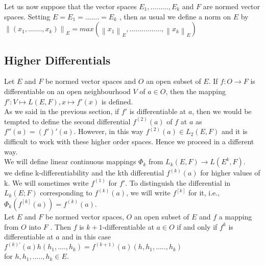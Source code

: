 \documentclass[11 pt]{article}
\theoremstyle{definition}
\theoremstyle{remark}
\newcommand\norm[1]{\left\lVert#1\right\rVert}
\begin{document}
Let us now suppose that the vector spaces $E_1,.........,E_k$ and $F$ are normed vector
spaces. Setting $E =E_1 =.......= E_k$ , then as usual we define a norm on $E$ by\\
\hspace*{3cm} $ \norm{(x_1,.......,x_k)}_E = max (\norm{x_1}_E ,................, \norm{x_k}_E)$



\subsection{Higher Differentials}
Let $E$ and $F$ be normed vector spaces and $O$ an open subset of $E$. If $f: O \to F$ is differentiable on an open neighbourhood $V$ of $a \in O$, then the mapping\\
\hspace*{3cm} $f': V \mapsto L(E,F), x \mapsto f'(x)$ is defined.\\


As we said in the previous section, if $f'$ is differentiable at $a$, then we would be tempted to define the second differential $f^{(2)}(a)$ of $f$ at $a$ as $f''(a) = (f')'(a)$. However, in this way $f^{(2)}(a) \in L_2(E,F)$ and it is difficult to work with these higher order spaces. Hence we proceed in a different way.\\

We will define linear continuous mappings $\Phi_k$ from $L_k (E, F) \to L(E^k, F)$. \\

we define k-differentiability and the kth differential $f^{(k)}(a)$ for higher values of k. We will sometimes write $f^{(1)}$ for $f'$. To distinguish the differential in $L_k(E; F)$  corresponding to $f^{(k)}(a)$, we will write $f^{[k]}$ for it, i.e., $\Phi_k (f^{[k]}(a)) = f^{(k)}(a)$.\\
 
\proposition Let $E$ and $F$ be normed vector spaces, $O$ an open subset of $E$ and $f$ a mapping from $O$ into $F$ . Then $f$ is $k + 1$-differentiable at $a \in O$ if and only if $f^k$ is differentiable at $a$ and in this case\\
\hspace*{3cm} $f^{(k)'}(a)h(h_1,....,h_k) = f^{(k+1)}(a)(h,h_1,.....,h_k)$\\

for $h,h_1,.....,h_k \in E$.
\end{document}
